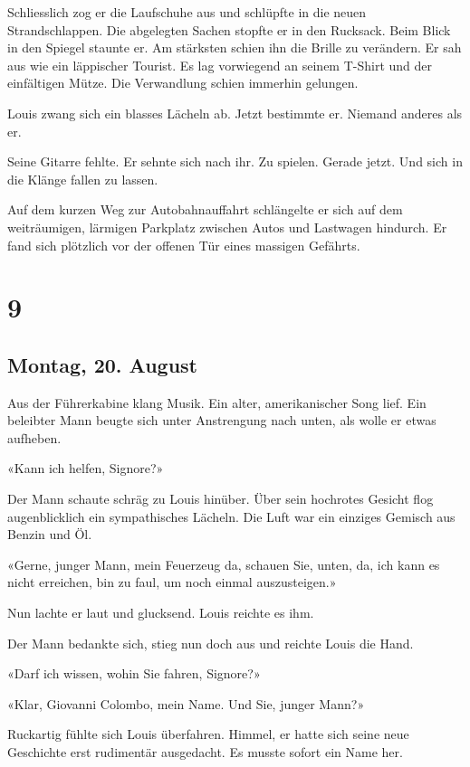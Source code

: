 Schliesslich zog er die Laufschuhe aus und schlüpfte in die neuen
Strandschlappen. Die abgelegten Sachen stopfte er in den Rucksack. Beim
Blick in den Spiegel staunte er. Am stärksten schien ihn die Brille zu
verändern. Er sah aus wie ein läppischer Tourist. Es lag vorwiegend an
seinem T-Shirt und der einfältigen Mütze. Die Verwandlung schien
immerhin gelungen.

Louis zwang sich ein blasses Lächeln ab. Jetzt bestimmte er. Niemand
anderes als er.

Seine Gitarre fehlte. Er sehnte sich nach ihr. Zu spielen. Gerade jetzt.
Und sich in die Klänge fallen zu lassen.

Auf dem kurzen Weg zur Autobahnauffahrt schlängelte er sich auf dem
weiträumigen, lärmigen Parkplatz zwischen Autos und Lastwagen hindurch.
Er fand sich plötzlich vor der offenen Tür eines massigen Gefährts.

\chapter{9}\label{section-8}

\section{Montag, 20. August}\label{montag-20.-august-1}

Aus der Führerkabine klang Musik. Ein alter, amerikanischer Song lief.
Ein beleibter Mann beugte sich unter Anstrengung nach unten, als wolle
er etwas aufheben.

«Kann ich helfen, Signore?»

Der Mann schaute schräg zu Louis hinüber. Über sein hochrotes Gesicht
flog augenblicklich ein sympathisches Lächeln. Die Luft war ein einziges
Gemisch aus Benzin und Öl.

«Gerne, junger Mann, mein Feuerzeug da, schauen Sie, unten, da, ich kann
es nicht erreichen, bin zu faul, um noch einmal auszusteigen.»

Nun lachte er laut und glucksend. Louis reichte es ihm.

Der Mann bedankte sich, stieg nun doch aus und reichte Louis die Hand.

«Darf ich wissen, wohin Sie fahren, Signore?»

«Klar, Giovanni Colombo, mein Name. Und Sie, junger Mann?»

Ruckartig fühlte sich Louis überfahren. Himmel, er hatte sich seine neue
Geschichte erst rudimentär ausgedacht. Es musste sofort ein Name her.

